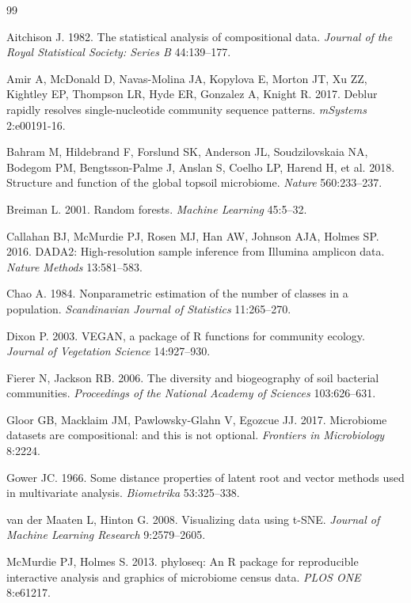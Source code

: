 \documentclass[12pt, oneside]{report}
\begin{document}
\begin{thebibliography}{99}

Aitchison J. 1982.
The statistical analysis of compositional data.
\textit{Journal of the Royal Statistical Society: Series B} 44:139--177.

Amir A, McDonald D, Navas-Molina JA, Kopylova E, Morton JT, Xu ZZ, Kightley EP,
Thompson LR, Hyde ER, Gonzalez A, Knight R. 2017.
Deblur rapidly resolves single-nucleotide community sequence patterns.
\textit{mSystems} 2:e00191-16.

Bahram M, Hildebrand F, Forslund SK, Anderson JL, Soudzilovskaia NA, Bodegom PM,
Bengtsson-Palme J, Anslan S, Coelho LP, Harend H, et al. 2018.
Structure and function of the global topsoil microbiome.
\textit{Nature} 560:233--237.

Breiman L. 2001.
Random forests.
\textit{Machine Learning} 45:5--32.

Callahan BJ, McMurdie PJ, Rosen MJ, Han AW, Johnson AJA, Holmes SP. 2016.
DADA2: High-resolution sample inference from Illumina amplicon data.
\textit{Nature Methods} 13:581--583.

Chao A. 1984.
Nonparametric estimation of the number of classes in a population.
\textit{Scandinavian Journal of Statistics} 11:265--270.

Dixon P. 2003.
VEGAN, a package of R functions for community ecology.
\textit{Journal of Vegetation Science} 14:927--930.

Fierer N, Jackson RB. 2006.
The diversity and biogeography of soil bacterial communities.
\textit{Proceedings of the National Academy of Sciences} 103:626--631.

Gloor GB, Macklaim JM, Pawlowsky-Glahn V, Egozcue JJ. 2017.
Microbiome datasets are compositional: and this is not optional.
\textit{Frontiers in Microbiology} 8:2224.

Gower JC. 1966.
Some distance properties of latent root and vector methods used in multivariate analysis.
\textit{Biometrika} 53:325--338.

van der Maaten L, Hinton G. 2008.
Visualizing data using t-SNE.
\textit{Journal of Machine Learning Research} 9:2579--2605.

McMurdie PJ, Holmes S. 2013.
phyloseq: An R package for reproducible interactive analysis and graphics of
microbiome census data.
\textit{PLOS ONE} 8:e61217.


\end{thebibliography}
\end{document}
